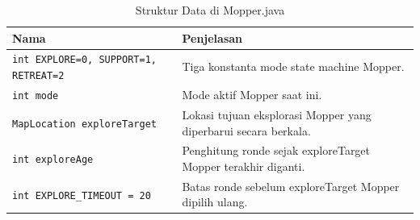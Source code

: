 \documentclass{article}
\begin{document}
\begin{enumerate}[label=\alph*.]
\begin{longtable}{|p{}|p{}|}
    \caption{Struktur Data di Mopper.java} \\
\hline
\textbf{Nama} & \textbf{Penjelasan} \\
\hline
\endhead
\hline
\endfoot
\texttt{int EXPLORE=0, SUPPORT=1, RETREAT=2} & Tiga konstanta mode state machine Mopper. \\
\hline
\texttt{int mode} & Mode aktif Mopper saat ini. \\
\hline
\texttt{MapLocation exploreTarget} & Lokasi tujuan eksplorasi Mopper yang diperbarui secara berkala. \\
\hline
\texttt{int exploreAge} & Penghitung ronde sejak exploreTarget Mopper terakhir diganti. \\
\hline
\texttt{int EXPLORE\_TIMEOUT = 20} & Batas ronde sebelum exploreTarget Mopper dipilih ulang. \\
\hline
\end{longtable}


\end{enumerate}
\end{document}
